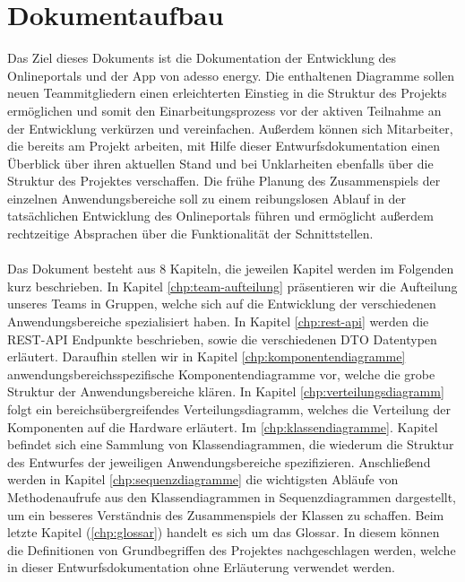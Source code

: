 \section{Dokumentaufbau}\label{sec:dokumentaufbau}
Das Ziel dieses Dokuments ist die Dokumentation der Entwicklung des Onlineportals und der App von adesso energy. 
Die enthaltenen Diagramme sollen neuen Teammitgliedern einen erleichterten Einstieg in die Struktur des Projekts ermöglichen 
und somit den Einarbeitungsprozess vor der aktiven Teilnahme an der Entwicklung verkürzen und vereinfachen.  
Außerdem können sich Mitarbeiter, die bereits am Projekt arbeiten, mit Hilfe dieser Entwurfsdokumentation einen Überblick über 
ihren aktuellen Stand und bei Unklarheiten ebenfalls über die Struktur des Projektes verschaffen.
Die frühe Planung des Zusammenspiels der einzelnen Anwendungsbereiche soll zu einem reibungslosen Ablauf 
in der tatsächlichen Entwicklung des Onlineportals führen und ermöglicht außerdem rechtzeitige Absprachen über die Funktionalität 
der Schnittstellen.
\\\\
Das Dokument besteht aus 8 Kapiteln, die jeweilen Kapitel werden im Folgenden kurz beschrieben. In Kapitel \ref{chp:team-aufteilung} präsentieren wir die Aufteilung unseres Teams in Gruppen, welche sich auf die Entwicklung der verschiedenen Anwendungsbereiche spezialisiert haben. In Kapitel \ref{chp:rest-api} werden die REST-API Endpunkte beschrieben, sowie die verschiedenen DTO Datentypen erläutert. Daraufhin stellen wir in Kapitel \ref{chp:komponentendiagramme} anwendungsbereichsspezifische Komponentendiagramme vor, welche die grobe Struktur der Anwendungsbereiche klären. In Kapitel \ref{chp:verteilungsdiagramm} folgt ein bereichsübergreifendes Verteilungsdiagramm, welches die Verteilung der Komponenten auf die Hardware erläutert. 
Im \ref{chp:klassendiagramme}. Kapitel befindet sich eine Sammlung von Klassendiagrammen, die wiederum die Struktur des Entwurfes der jeweiligen Anwendungsbereiche spezifizieren. Anschließend werden in Kapitel \ref{chp:sequenzdiagramme} die wichtigsten Abläufe von Methodenaufrufe aus den Klassendiagrammen in Sequenzdiagrammen dargestellt, um ein besseres Verständnis des Zusammenspiels der Klassen zu schaffen. Beim letzte Kapitel (\ref{chp:glossar}) handelt es sich um das Glossar. 
In diesem können die Definitionen von Grundbegriffen des Projektes nachgeschlagen werden, welche in 
dieser Entwurfsdokumentation ohne Erläuterung verwendet werden. \newpage

